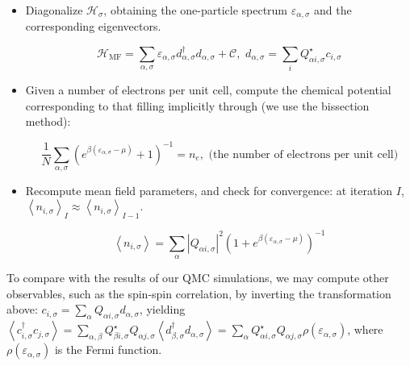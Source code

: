 \begin{itemize}
\item Diagonalize $\mathcal{H}_\sigma$, obtaining the one-particle spectrum $\varepsilon_{\alpha, \sigma}$ and the corresponding eigenvectors.

\begin{equation}
\mathcal{H}_{\text{MF}} = \sum_{\alpha, \sigma} \varepsilon_{\alpha, \sigma} d_{\alpha, \sigma}^\dagger d_{\alpha, \sigma} + \mathcal{C} , \,\, d_{\alpha, \sigma} = \sum_i Q_{\alpha i, \sigma}^\star c_{i,\sigma}
\end{equation}

\item Given a number of electrons per unit cell, compute the chemical potential corresponding to that filling implicitly through (we use the bissection method):

\begin{equation}\label{eq:implicitChemPot}
\frac{1}{N} \sum_{\alpha, \sigma} (  e^{\beta ( \varepsilon_{\alpha, \sigma} - \mu ) } +1 )^{-1} = n_e , \,\, \text{(the number of electrons per unit cell)}
\end{equation}

\item Recompute mean field parameters, and check for convergence: at iteration $I$, $\left\langle n_{i,\sigma} \right\rangle_I \approx \left\langle n_{i,\sigma} \right\rangle_{I - 1}$.

\begin{equation}\label{eq:selfConsistent}
\left\langle n_{i,\sigma} \right\rangle = \sum_\alpha | Q_{\alpha i, \sigma} |^2 ( 1 + e^ { \beta ( \varepsilon_{\alpha, \sigma} - \mu )} )^{-1}
\end{equation}

\end{itemize}

To compare with the results of our \ac{QMC} simulations, we may compute other observables, such as the spin-spin correlation, by inverting the transformation above: $c_{i, \sigma} = \sum_{\alpha} Q_{\alpha i, \sigma} d_{\alpha, \sigma}$, yielding $\left\langle c_{i,\sigma}^\dagger c_{j,\sigma} \right\rangle = \sum_{\alpha, \beta} Q_{\beta i, \sigma}^\star Q_{\alpha j, \sigma} \left\langle d_{\beta,\sigma}^\dagger d_{\alpha,\sigma} \right\rangle = \sum_\alpha Q_{\alpha i, \sigma}^\star Q_{\alpha j, \sigma} \rho ( \varepsilon_{\alpha, \sigma} ) $, where $\rho (\varepsilon_{\alpha, \sigma})$ is the Fermi function.

